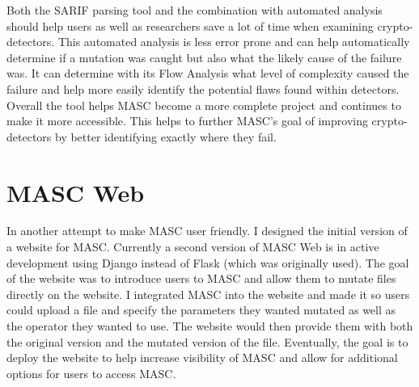 Both the SARIF parsing tool and the combination with automated analysis should help users as well as researchers save a lot of time when examining crypto-detectors. This automated analysis is less error prone and can help automatically determine if a mutation was caught but also what the likely cause of the failure was. It can determine with its Flow Analysis what level of complexity caused the failure and help more easily identify the potential flaws found within detectors. Overall the tool helps MASC become a more complete project and continues to make it more accessible. This helps to further MASC’s goal of improving crypto-detectors by better identifying exactly where they fail. 

\section{MASC Web}
\label{ch3:subsec:web}

In another attempt to make MASC user friendly. I designed the initial version of a website for MASC. Currently a second version of MASC Web is in active development using Django instead of Flask (which was originally used). The goal of the website was to introduce users to MASC and allow them to mutate files directly on the website. I integrated MASC into the website and made it so users could upload a file and specify the parameters they wanted mutated as well as the operator they wanted to use. The website would then provide them with both the original version and the mutated version of the file. Eventually, the goal is to deploy the website to help increase visibility of MASC and allow for additional options for users to access MASC.

